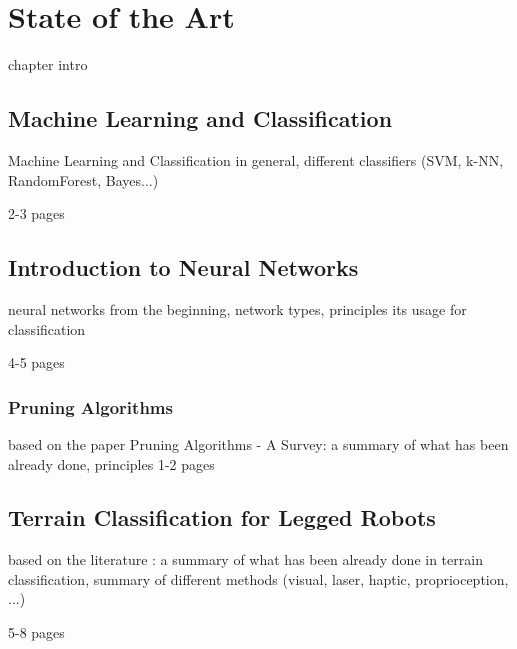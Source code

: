\chapter{State of the Art}
\label{chapter:01:state_of_the_art}

chapter intro

\section{Machine Learning and Classification}

Machine Learning and Classification in general, different classifiers (SVM, k-NN, RandomForest, Bayes...)

2-3 pages

\section{Introduction to Neural Networks}

neural networks from the beginning, network types, principles its usage for classification

4-5 pages

\subsection{Pruning Algorithms}

based on the paper Pruning Algorithms - A Survey: a summary of what has been already done, principles 
1-2 pages

\section{Terrain Classification for Legged Robots}

based on the literature : a summary of what has been already done in terrain classification, summary of different methods (visual, laser, haptic, proprioception, ...)

5-8 pages